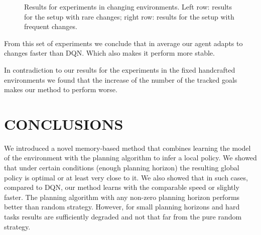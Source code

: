 \documentclass[a4paper,twoside]{article}
\begin{document}
\begin{figure}
  \centering
  \begin{minipage}{.49\linewidth}
    
    
    
    
  \end{minipage}
  \begin{minipage}{.49\linewidth}
    
    
    
    
  \end{minipage}

  \caption{Results for experiments in changing environments. Left row: results for the setup with rare changes; right row: results for the setup with frequent changes.}
\end{figure}

From this set of experiments we conclude that in average our agent adapts to changes faster than DQN. Which also makes it perform more stable.

In contradiction to our results for the experiments in the fixed handcrafted environments we found that the increase of the number of the tracked goals makes our method to perform worse.

\section{\uppercase{Conclusions}}

We introduced a novel memory-based method that combines learning the model of the environment with the planning algorithm to infer a local policy. We showed that under certain conditions (enough planning horizon) the resulting global policy is optimal or at least very close to it. We also showed that in such cases, compared to DQN, our method learns with the comparable speed or slightly faster. The planning algorithm with any non-zero planning horizon performs better than random strategy. However, for small planning horizons and hard tasks results are sufficiently degraded and not that far from the pure random strategy.
\end{document}
